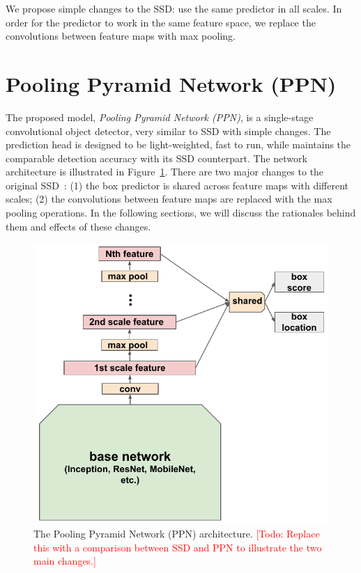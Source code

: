 \documentclass[10pt,twocolumn,letterpaper]{article}
\newcommand{\todo}[1]{\textcolor{red}{[Todo: #1]}}
\begin{document}
We propose simple changes to the SSD: use the same predictor
in all scales. In order for the predictor to work in the
same feature space, we replace the convolutions between
feature maps with max pooling.










\section{Pooling Pyramid Network (PPN)}
The proposed model, \textit{Pooling Pyramid Network (PPN)},
is a single-stage convolutional object detector, very
similar to SSD with simple changes.  The prediction head is
designed to be light-weighted, fast to run, while maintains
the comparable detection accuracy with its SSD counterpart.
The network architecture is illustrated in
Figure~\ref{fig:ppn}.  There are two major changes to the
original SSD~\cite{liu2016ssd}: (1) the box predictor is
shared across feature maps with different scales; (2) the
convolutions between feature maps are replaced with the max
pooling operations.  In the following sections, we will
discuss the rationales behind them and effects of these
changes.

\begin{figure}[t]
\begin{center}
\includegraphics[width=0.8\linewidth]{figure/ppn.pdf}
\end{center}
\caption{
  The Pooling Pyramid Network (PPN) architecture.
  \todo{Replace this with a comparison between SSD and PPN
  to illustrate the two main changes.}
}
\label{fig:ppn}
\end{figure}
\end{document}
